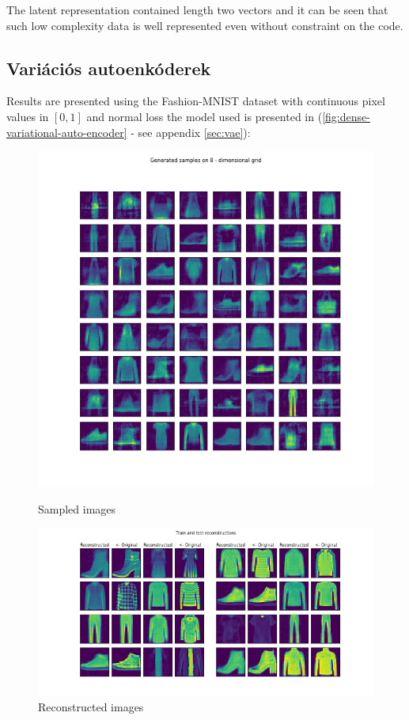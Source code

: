 \documentclass[12pt, english]{article}
\begin{document}
\vspace{4mm}

\par The latent representation contained length two vectors and it can be seen that such low complexity data is well represented even without constraint on the code.

\newpage

\subsection{Variációs autoenkóderek}

\vspace{5mm}

\par Results are presented using the Fashion-MNIST dataset with continuous pixel values in $[0, 1]$ and normal loss the model used is presented in (\ref{fig:dense-variational-auto-encoder} - see appendix \ref{sec:vae}):

\vspace{4mm}

\begin{figure}[ht] 
  \label{fig:auto_encoder_results} 
  \begin{minipage}{0.5\linewidth}
    \centering
    \includegraphics[width=.65\linewidth]{gen/generated_samples_fashion_mnist_dense_vae.png} 
    \caption{Sampled images} 
  \end{minipage}%
  \begin{minipage}{0.5\linewidth}
    \centering
    \includegraphics[width=.95\linewidth]{reco/reconstrunction_samples_fashion_mnist_dense_vae.png} 
    \caption{Reconstructed images} 
  \end{minipage} 
\end{figure}
\end{document}
